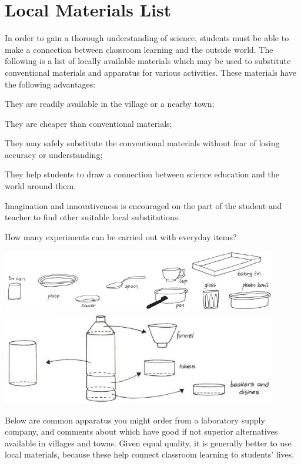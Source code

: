 
\chapter{Local Materials List}
\label{cha:local-materials}

In order to gain a thorough understanding of science, students must be able to make a connection between classroom learning and the outside world. The following is a list of locally available materials which may be used to substitute conventional materials and apparatus for various activities. These materials have the following advantages: 
\begin{itemize*}
\item They are readily available in the village or a nearby town;
\item They are cheaper than conventional materials; 
\item They may safely substitute the conventional materials without fear of losing accuracy or understanding; 
\item They help students to draw a connection between science education and the world around them.
\end{itemize*}
Imagination and innovativeness is encouraged on the part of the student and teacher to find other suitable local substitutions. 

How many experiments can be carried out with everyday items?

\begin{center}
\includegraphics[width=12cm]{./img/vso/using-local-materials.jpg}
\includegraphics[width=12cm]{./img/vso/multi-purpose-bottle.jpg}
\end{center}

Below are common apparatus you might order from a laboratory supply company, 
and comments about which have good if not superior alternatives 
available in villages and towns. 
Given equal quality, 
it is generally better to use local materials, 
because these help connect classroom learning to students' lives.\\

